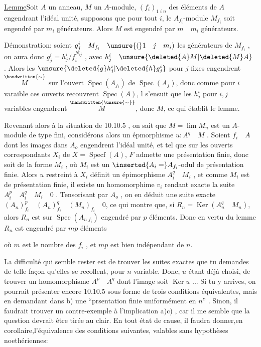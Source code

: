 \uline{Lemme}\quad Soit $A$ un anneau, $M$ un $A$-module, $(f_i)_{1\;i\;n}$ des éléments de $A$ engendrant l'idéal unité,  supposons que pour tout $i$, le $A_{f_i}$-module $M_{f_i}$ soit engendré par $m_i$ générateurs. Alors $M$ est engendré par $m\quad m_i$ générateurs.

Démonstration: soient $g_j^i\quad M_{f_i}\quad\unsure{(}1\quad j\quad m_i)$ les générateurs de $M_{f_i}$ , on aura donc $g_j^i=h_j^i/f_i^{N_{ij}}$ , avec $h_j^i\quad \unsure{\deleted{A}M|\deleted{M}A}$ . Alors les $\unsure{\deleted{g}h_j^i|\deleted{h}g_j^i}$ pour $j$ fixes engendrent $\overset{\handwritten{\sim}}{M}$ sur l'ouvert $\operatorname{Spec}(A_{f_i})$ de $\operatorname{Spec}(A_f)$, donc comme pour $i$ varaible ces ouverts recouvrent $\operatorname{Spec}(A)$, l s'ensuit que les $h_j^i$ pour $i,j$ variables engendrent $\overset{\handwritten{\unsure{\sim}}}{M}$, donc $M$, ce qui établit le lemme.

Revenant alors à la situation de 10.10.5 , on sait que $M=\lim M_n$ est un $A$-module de type fini, considérons alors un épmorphisme $u:A^q\quad M$ . Soient $f_i\quad A$ dont les images dans $A_o$ engendrent l'idéal unité, et tel que sur les  ouverts correspondants $X_i$ de $X=\operatorname{Specf}(A)$, $F$ admette une présentation finie, donc soit de la forme $M_i$ , où $M_i$ est un $\inserted{A_i=}A_{f_i}$-odul de présentation finie. Alors $u$ restreint à $X_i$ définit un épimorphisme $A_i^q\quad M_i$ , et comme $M_i$ est de présentation finie, il existe un homomorphime $v_i$ rendant exacte la suite $A_i^p\quad A_i^q\quad M_i\quad0$ . Tensorisant par $A_o$ , on en déduit une suite exacte $(A_n)_{f_i}^p\quad(A_n)_{f_i}^q\quad(M_n)_{f_i}\quad0$, ce qui montre que, si $R_n=\operatorname{Ker}(A_n^q\quad M_n)$, alors $R_n$ est sur $\operatorname{Spec}(A_{n\;f_i})$ engendré par $p$ éléments. Donc en vertu du lemme $R_n$ est engendré par $mp$ éléments

où $m$ est le nombre des $f_i$ , et $mp$ est bien indépendant de $n$.

La difficulté qui  semble rester est de trouver les suites exactes que tu demandes de telle façon qu'elles se recollent, pour $n$ variable. Donc, $u$ étant déjà choisi, de trouver un homomorphisme $A^p\quad A^q$  dont l'image soit $\operatorname{Ker}u$ ... Si tu y arrives, on pourrait présenter encore 10.10.5 sous forme de trois conditions équivalentes, mais en demandant dans b) une ``prsentation finie uniformément en $n$'' . Sinon, il faudrait trouver un contre-exemple à  l'implication a)\quad c) , car il me semble que la question devrait être tirée au clair. En tout état de cause, il faudra donner,en corollaire,l'équivalence des conditions suivantes, valables sans hypothèses noethériennes:

